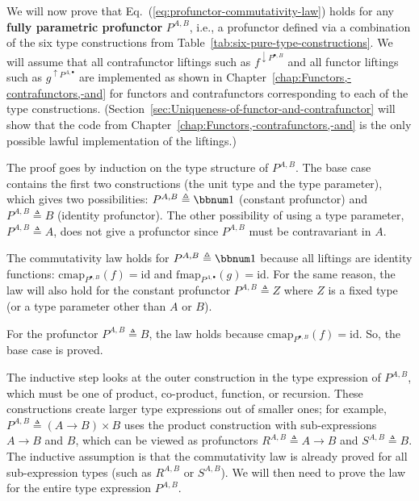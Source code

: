 We will now prove that Eq.~(\ref{eq:profunctor-commutativity-law})
holds for any \textbf{fully parametric profunctor}
$P^{A,B}$, i.e., a profunctor defined via a combination of the six
type constructions from Table~\ref{tab:six-pure-type-constructions}.
We will assume that all contrafunctor liftings such as $f^{\downarrow P^{\bullet,B}}$
and all functor liftings such as $g^{\uparrow P^{A,\bullet}}$ are
implemented as shown in Chapter~\ref{chap:Functors,-contrafunctors,-and}
for functors and contrafunctors corresponding to each of the type
constructions. (Section~\ref{sec:Uniqueness-of-functor-and-contrafunctor}
will show that the code from Chapter~\ref{chap:Functors,-contrafunctors,-and}
is the only possible lawful implementation of the liftings.)

The proof goes by induction on the type structure of $P^{A,B}$. The
base case contains the first two constructions (the unit type and
the type parameter), which gives two possibilities: $P^{A,B}\triangleq\bbnum 1$
(constant profunctor) and $P^{A,B}\triangleq B$ (identity profunctor).
The other possibility of using a type parameter, $P^{A,B}\triangleq A$,
does not give a profunctor since $P^{A,B}$ must be contravariant
in $A$.

The commutativity law holds for $P^{A,B}\triangleq\bbnum 1$ because
all liftings are identity functions: $\text{cmap}_{P^{\bullet,B}}(f)=\text{id}$
and $\text{fmap}_{P^{A,\bullet}}(g)=\text{id}$. For the same reason,
the law will also hold for the constant profunctor $P^{A,B}\triangleq Z$
where $Z$ is a fixed type (or a type parameter other than $A$ or
$B$).

For the profunctor $P^{A,B}\triangleq B$, the law holds because $\text{cmap}_{P^{\bullet,B}}(f)=\text{id}$.
So, the base case is proved.

The inductive step looks at the outer construction in the type expression
of $P^{A,B}$, which must be one of product, co-product, function,
or recursion. These constructions create larger type expressions out
of smaller ones; for example, $P^{A,B}\triangleq\left(A\rightarrow B\right)\times B$
uses the product construction with sub-expressions $A\rightarrow B$
and $B$, which can be viewed as profunctors $R^{A,B}\triangleq A\rightarrow B$
and $S^{A,B}\triangleq B$. The inductive assumption is that the commutativity
law is already proved for all sub-expression types (such as $R^{A,B}$
or $S^{A,B}$). We will then need to prove the law for the entire
type expression $P^{A,B}$.

